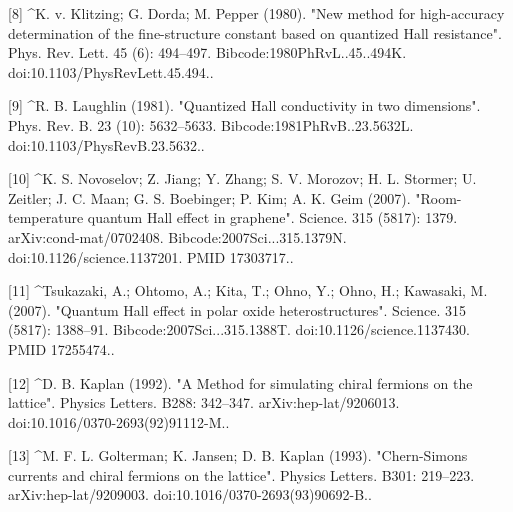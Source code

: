 [8]
^K. v. Klitzing; G. Dorda; M. Pepper (1980). "New method for high-accuracy determination of the fine-structure constant based on quantized Hall resistance". Phys. Rev. Lett. 45 (6): 494–497. Bibcode:1980PhRvL..45..494K. doi:10.1103/PhysRevLett.45.494..

[9]
^R. B. Laughlin (1981). "Quantized Hall conductivity in two dimensions". Phys. Rev. B. 23 (10): 5632–5633. Bibcode:1981PhRvB..23.5632L. doi:10.1103/PhysRevB.23.5632..

[10]
^K. S. Novoselov; Z. Jiang; Y. Zhang; S. V. Morozov; H. L. Stormer; U. Zeitler; J. C. Maan; G. S. Boebinger; P. Kim; A. K. Geim (2007). "Room-temperature quantum Hall effect in graphene". Science. 315 (5817): 1379. arXiv:cond-mat/0702408. Bibcode:2007Sci...315.1379N. doi:10.1126/science.1137201. PMID 17303717..

[11]
^Tsukazaki, A.; Ohtomo, A.; Kita, T.; Ohno, Y.; Ohno, H.; Kawasaki, M. (2007). "Quantum Hall effect in polar oxide heterostructures". Science. 315 (5817): 1388–91. Bibcode:2007Sci...315.1388T. doi:10.1126/science.1137430. PMID 17255474..

[12]
^D. B. Kaplan (1992). "A Method for simulating chiral fermions on the lattice". Physics Letters. B288: 342–347. arXiv:hep-lat/9206013. doi:10.1016/0370-2693(92)91112-M..

[13]
^M. F. L. Golterman; K. Jansen; D. B. Kaplan (1993). "Chern-Simons currents and chiral fermions on the lattice". Physics Letters. B301: 219–223. arXiv:hep-lat/9209003. doi:10.1016/0370-2693(93)90692-B..